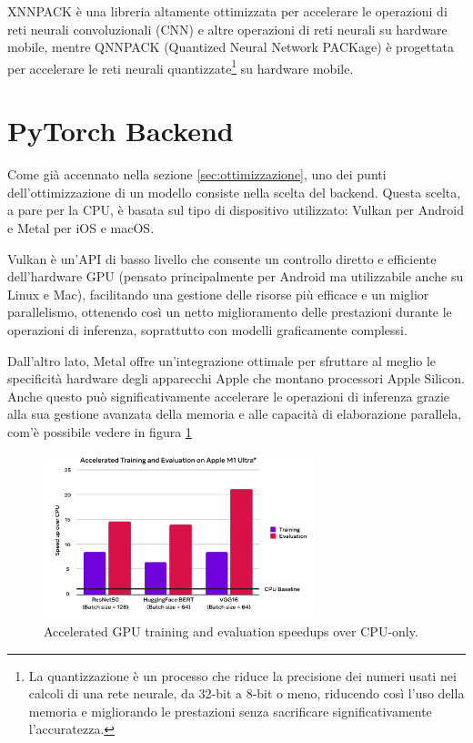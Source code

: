 XNNPACK\cite{XNNPACK} è una libreria altamente ottimizzata per accelerare le operazioni di reti neurali convoluzionali (CNN) e altre operazioni di reti neurali su hardware mobile,
mentre QNNPACK\cite{QNNPACK} (Quantized Neural Network PACKage) è progettata per accelerare le reti neurali quantizzate\footnote{La quantizzazione è un processo che riduce la precisione dei numeri usati nei calcoli di una rete neurale, da 32-bit a 8-bit o meno, riducendo così l'uso della memoria e migliorando le prestazioni senza sacrificare significativamente l'accuratezza.}
su hardware mobile.



\section{PyTorch Backend}
Come già accennato nella sezione \ref{sec:ottimizzazione}, uno dei punti dell'ottimizzazione di un modello consiste nella scelta del backend. Questa scelta,
a pare per la CPU, è basata sul tipo di dispositivo utilizzato: Vulkan per Android e Metal per iOS e macOS.

Vulkan\cite{Vulkan} è un'API di basso livello che consente un controllo diretto e efficiente dell'hardware GPU (pensato principalmente per Android ma
utilizzabile anche su Linux e Mac), facilitando una gestione delle risorse più efficace e un miglior parallelismo, ottenendo così un netto miglioramento
delle prestazioni durante le operazioni di inferenza, soprattutto con modelli graficamente complessi.

Dall'altro lato, Metal\cite{Metal} offre un'integrazione ottimale per sfruttare al meglio le specificità hardware degli apparecchi Apple che montano
processori Apple Silicon. Anche questo può significativamente accelerare le operazioni di inferenza grazie alla sua gestione avanzata della memoria e
alle capacità di elaborazione parallela, com'è possibile vedere in figura \ref{fig:metal}

\begin{figure}
    \centering
    \includegraphics[width=0.7\textwidth]{Immagini/metal.png}
    \caption{Accelerated GPU training and evaluation speedups over CPU-only.}
    \label{fig:metal}
\end{figure}